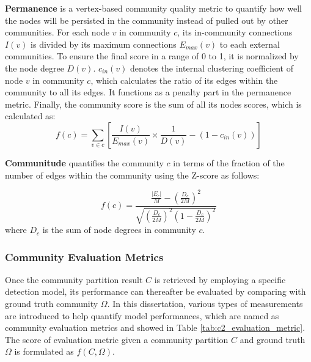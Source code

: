 \textbf{Permanence} \cite{chakraborty2014permanence,chakraborty2016permanence} is a vertex-based community quality metric to quantify how well the nodes will be persisted in the community instead of pulled out by other communities. For each node $v$ in community $c$, its in-community connections $I(v)$ is divided by its maximum connections $E_{max}(v)$ to each external communities. To ensure the final score in a range of 0 to 1, it is normalized by the node degree $D(v)$. $c_{in}(v)$  denotes the internal clustering coefficient of node $v$ in community $c$, which calculates the ratio of its edges within the community to all its edges. It functions as a penalty part in the permanence metric. Finally, the community score is the sum of all its nodes scores, which is calculated as:
\begin{equation}
f(c) = \sum_{v \in c}\left[ \frac{I(v)}{E_{max}(v) } \times \frac{1}{D(v)}- (1-c_{in}(v))\right]
\end{equation}



\textbf{Communitude} \cite{miyauchi2015network} quantifies the community $c$ in terms of the fraction of the number of edges
within the community using the Z-score as follows:

\begin{equation}
f(c) = \frac{\frac{|E_c|}{M} - \left(\frac{D_c}{2M}\right)^2}{\sqrt{\left(\frac{D_c}{2M}\right)^2\left(1-\frac{D_c}{2M}\right)^2}}
\end{equation}
where $D_c$ is the sum of node degrees in community $c$.

\subsubsection{Community Evaluation Metrics}

Once the community partition result $C$ is retrieved by employing a specific detection model, its performance can thereafter be evaluated by comparing with ground truth community $\Omega$. In this dissertation, various types of measurements are introduced to help quantify model performances, which are named as community evaluation metrics and showed in Table \ref{tab:c2_evaluation_metric}. The score of evaluation metric given a community partition $C$ and ground truth $\Omega$ is formulated as $f(C,\Omega)$.


